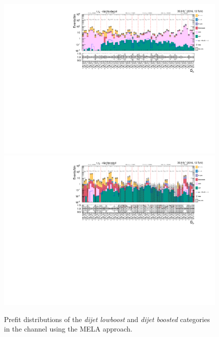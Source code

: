 \begin{figure}[h!]
        \centering
        \includegraphics[width=\textwidth]{Figures/statana/Postfit_JEC_mela3D/prefit_htt_tt_3_13TeV.pdf}\\
        \includegraphics[width=\textwidth]{Figures/statana/Postfit_JEC_mela3D/prefit_htt_tt_4_13TeV.pdf}         
    \caption{Prefit distributions of the \textit{dijet lowboost} and \textit{dijet boosted} categories in the \tautau{} channel  using the MELA approach.}
\end{figure}
\clearpage
